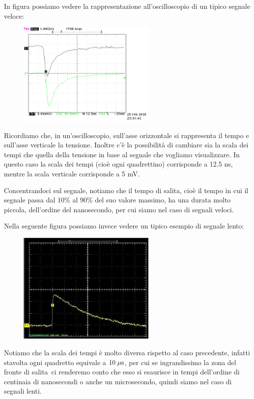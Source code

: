 \begin{esempio}
   In figura possiamo vedere la rappresentazione all'oscilloscopio di un tipico segnale veloce:
   \begin{figure}[H]
      \centering
      \includegraphics[width=0.6\textwidth]{immagini/esempio_segnale_veloce.png}
   \end{figure}
   Ricordiamo che, in un'oscilloscopio, sull'asse orizzontale si rappresenta il tempo e sull'asse verticale la tensione. Inoltre c'è la possibilità di cambiare sia la scala dei tempi che quella della tensione in base al segnale che vogliamo visualizzare. In questo caso la scala dei tempi (cioè ogni quadrettino) corrisponde a 12.5 ns, mentre la scala verticale corrisponde a 5 mV.
   
   Concentrandoci sul segnale, notiamo che il tempo di salita\footnotemark, cioè il tempo in cui il segnale passa dal 10\% al 90\% del suo valore massimo, ha una durata molto piccola, dell'ordine del nanosecondo, per cui siamo nel caso di segnali veloci.
\end{esempio}


\begin{esempio}
   Nella seguente figura possiamo invece vedere un tipico esempio di segnale lento:
   \begin{figure}[H]
      \centering
      \includegraphics[width=0.6\textwidth]{immagini/esempio_segnale_lento.png}
   \end{figure}
   Notiamo che la scala dei tempi è molto diversa rispetto al caso precedente, infatti stavolta ogni quadretto equivale a $10 \; \rm \mu s$, per cui se ingrandissimo la zona del fronte di salita\footnotemark\, ci renderemo conto che esso si esaurisce in tempi dell'ordine di centinaia di nanosecondi o anche un microsecondo, quindi siamo nel caso di segnali lenti.
\end{esempio}

